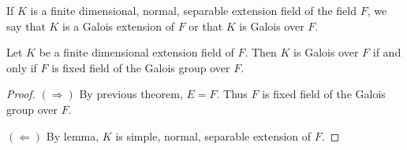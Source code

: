 \begin{definition}
    If $K$ is a finite dimensional, normal, separable extension field of the field $F$, we say that 
    $K$ is a Galois extension of $F$ or that $K$ is Galois over $F$.
\end{definition}

\begin{corollary}
    Let $K$ be a finite dimensional extension field of $F$. Then $K$ is Galois over $F$ if and only if
    $F$ is fixed field of the Galois group over $F$.
\end{corollary}
\begin{proof}
    $(\Rightarrow)$ By previous theorem, $E = F$. Thus $F$ is fixed field of the Galois group over $F$.

    $(\Leftarrow)$ By lemma, $K$ is simple, normal, separable extension of $F$.
\end{proof}

